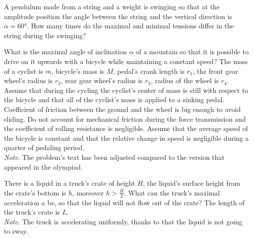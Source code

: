 \documentclass[11pt]{article}
\begin{document}

\probeng
A pendulum made from a string and a weight is swinging so that at the amplitude position the angle between the string and the vertical direction is $\alpha=\ang{60}$. How many times do the maximal and minimal tensions differ in the string during the swinging?
\probend
\bigskip


\probeng
What is the maximal angle of inclination $\alpha$ of a mountain so that it is possible to drive on it upwards with a bicycle while maintaining a constant speed? The mass of a cyclist is $m$, bicycle’s mass is $M$, pedal’s crank length is $r_1$, the front gear wheel’s radius is $r_2$, rear gear wheel’s radius is $r_3$, radius of the wheel is $r_4$. Assume that during the cycling the cyclist’s center of mass is still with respect to the bicycle and that all of the cyclist’s mass is applied to a sinking pedal. Coefficient of friction between the ground and the wheel is big enough to avoid sliding. Do not account for mechanical friction during the force transmission and the coefficient of rolling resistance is negligible. Assume that the average speed of the bicycle is constant and that the relative change in speed is negligible during a quarter of pedaling period.\\
\emph{Note}. The problem’s text has been adjusted compared to the version that appeared in the olympiad.
\probend
\bigskip


\probeng
There is a liquid in a truck’s crate of height $H$, the liquid’s surface height from the crate’s bottom is $h$, moreover $h > \frac{H}{2}$. What can the truck’s maximal acceleration $a$ be, so that the liquid will not flow out of the crate? The length of the truck’s crate is $L$.\\
\emph{Note}. The truck is accelerating uniformly, thanks to that the liquid is not going to sway.
\probend
\bigskip

\end{document}
